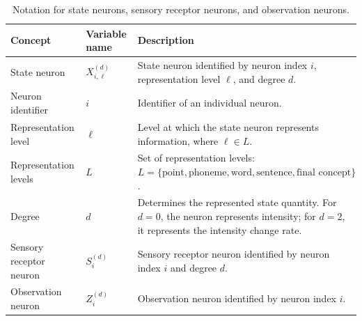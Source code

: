 \documentclass[a4paper]{article}
\title{}
\date{}
\author{Mohammad Rahmani}
\begin{document}
   \maketitle
   \begin{table}[H]

   \centering

   \small

   \setlength{\tabcolsep}{4pt}

   \begin{tabular}{p{} p{} p{}}

      \hline

      \textbf{Concept} & \textbf{Variable name} & \textbf{Description} \\

      \hline

      State neuron
      & $X_{i,\ell}^{(d)}$
      & State neuron identified by neuron index $i$, representation level $\ell$, and degree $d$. \\

      Neuron identifier
      & $i$
      & Identifier of an individual neuron. \\

      Representation level
      & $\ell$
      & Level at which the state neuron represents information, where $\ell \in L$. \\

      Representation levels
      & $L$
      & Set of representation levels: $L=\{\text{point},\text{phoneme},\text{word},\text{sentence},\text{final concept}\}$. \\

      Degree
      & $d$
      & Determines the represented state quantity. For $d=0$, the neuron represents intensity; for $d=2$, it represents the intensity change rate. \\

      Sensory receptor neuron
      & $S_{i}^{(d)}$
      & Sensory receptor neuron identified by neuron index $i$ and degree $d$. \\

      Observation neuron
      & $Z_{i}^{(d)}$
      & Observation neuron identified by neuron index $i$. \\

      \hline

   \end{tabular}

   \caption{Notation for state neurons, sensory receptor neurons, and observation neurons.}

   \label{tabel_neuron_state_observation_notation}

\end{table}
   
   
\end{document}
